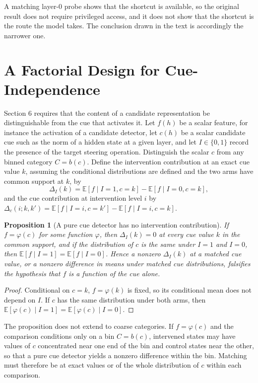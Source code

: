\documentclass[11pt]{article}
\newtheorem{proposition}{Proposition}
\theoremstyle{definition}
\theoremstyle{remark}
\begin{document}
 A matching layer-0 probe shows that the shortcut is available, so the original result does not require privileged access, and it does not show that the shortcut is the route the model takes. The conclusion drawn in the text is accordingly the narrower one.

\section{A Factorial Design for Cue-Independence}\label{app:cue}

Section 6 requires that the content of a candidate representation be distinguishable from the cue that activates it. Let $f(h)$ be a scalar feature, for instance the activation of a candidate detector, let $c(h)$ be a scalar candidate cue such as the norm of a hidden state at a given layer, and let $I\in\{0,1\}$ record the presence of the target steering operation. Distinguish the scalar $c$ from any binned category $C=b(c)$. Define the intervention contribution at an exact cue value $k$, assuming the conditional distributions are defined and the two arms have common support at $k$, by
\[
\Delta_I(k)=\mathbb{E}[f\mid I=1,c=k]-\mathbb{E}[f\mid I=0,c=k],
\]
and the cue contribution at intervention level $i$ by $\Delta_c(i;k,k')=\mathbb{E}[f\mid I=i,c=k']-\mathbb{E}[f\mid I=i,c=k]$.

\begin{proposition}[A pure cue detector has no intervention contribution]\label{prop:cue}
If $f=\varphi(c)$ for some function $\varphi$, then $\Delta_I(k)=0$ at every cue value $k$ in the common support, and if the distribution of $c$ is the same under $I=1$ and $I=0$, then $\mathbb{E}[f\mid I=1]=\mathbb{E}[f\mid I=0]$. Hence a nonzero $\Delta_I(k)$ at a matched cue value, or a nonzero difference in means under matched cue distributions, falsifies the hypothesis that $f$ is a function of the cue alone.
\end{proposition}

\begin{proof}
Conditional on $c=k$, $f=\varphi(k)$ is fixed, so its conditional mean does not depend on $I$. If $c$ has the same distribution under both arms, then $\mathbb{E}[\varphi(c)\mid I=1]=\mathbb{E}[\varphi(c)\mid I=0]$.
\end{proof}

The proposition does not extend to coarse categories. If $f=\varphi(c)$ and the comparison conditions only on a bin $C=b(c)$, intervened states may have values of $c$ concentrated near one end of the bin and control states near the other, so that a pure cue detector yields a nonzero difference within the bin. Matching must therefore be at exact values or of the whole distribution of $c$ within each comparison.
\end{document}

